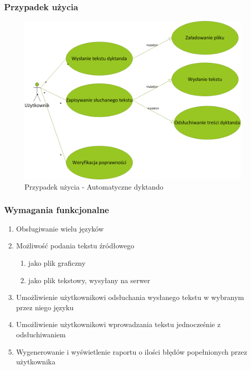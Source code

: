 \subsubsection{Przypadek użycia}
\begin{figure}[!h]
	\centering
	\includegraphics[scale=0.45]{useCaseDictando.png} 
	\caption{Przypadek użycia - Automatyczne dyktando }
\end{figure}


\subsubsection{Wymagania funkcjonalne}
\begin{enumerate}
	\item Obsługiwanie wielu języków
	\item Możliwość podania tekstu źródłowego
		\begin{enumerate}
			\item jako plik graficzny
			\item jako plik tekstowy, wysyłany na serwer
		\end{enumerate}
	\item Umożliwienie użytkownikowi odsłuchania wysłanego tekstu w wybranym przez niego języku
	\item Umożliwienie użytkownikowi wprowadzania tekstu jednocześnie z odsłuchiwaniem
	\item Wygenerowanie i wyświetlenie raportu o ilości błędów popełnionych przez użytkownika
\end{enumerate}

